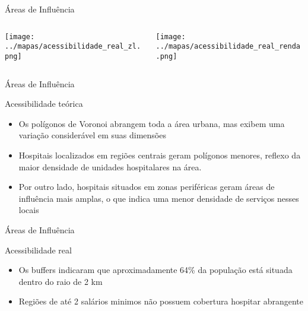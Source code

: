 \documentclass{beamer}
\begin{document}
\begin{frame}{Áreas de Influência}
    \begin{columns}
        \begin{column}{0.5\textwidth}
            \texttt{[image: ../mapas/acessibilidade\_real\_zl.png]} 
        \end{column}

        \begin{column}{0.5\textwidth}
            \texttt{[image: ../mapas/acessibilidade\_real\_renda.png]} 
        \end{column}
    \end{columns}
\end{frame}

\begin{frame}{Áreas de Influência}
    \begin{block}{Acessibilidade teórica}
      \begin{itemize}
        \item Os polígonos de Voronoi abrangem toda a área urbana, mas exibem uma variação considerável em suas dimensões
        \item Hospitais localizados em regiões centrais geram polígonos menores, reflexo da maior densidade de unidades hospitalares na área.
        \item Por outro lado, hospitais situados em zonas periféricas geram áreas de influência mais amplas, o que indica uma menor densidade de serviços nesses locais
      \end{itemize}
    \end{block}
\end{frame}

\begin{frame}{Áreas de Influência}
    \begin{block}{Acessibilidade real}
      \begin{itemize}
        \item Os buffers indicaram que aproximadamente 64\% da população está situada dentro do raio de 2 km
        \item Regiões de até 2 salários minimos não possuem cobertura hospitar abrangente
      \end{itemize}   
    \end{block}
\end{frame}
\end{document}

